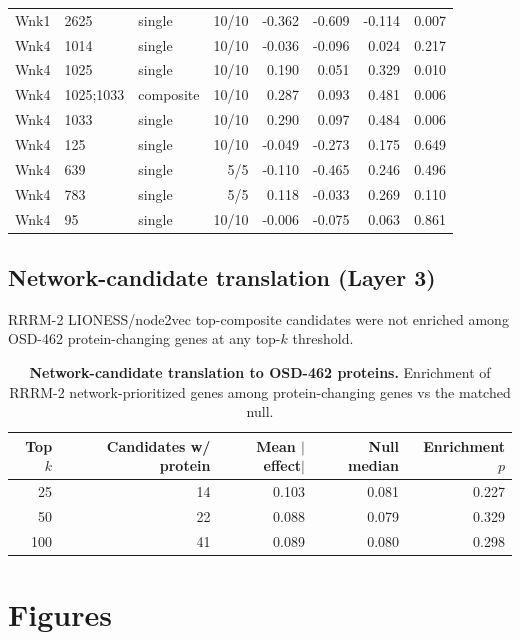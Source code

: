 \documentclass[10pt]{article}
\begin{document}
\begin{longtable}{lllrrrrr}
Wnk1 & 2625 & single & 10/10 & -0.362 & -0.609 & -0.114 & 0.007 \\
Wnk4 & 1014 & single & 10/10 & -0.036 & -0.096 & 0.024 & 0.217 \\
Wnk4 & 1025 & single & 10/10 & 0.190 & 0.051 & 0.329 & 0.010 \\
Wnk4 & 1025;1033 & composite & 10/10 & 0.287 & 0.093 & 0.481 & 0.006 \\
Wnk4 & 1033 & single & 10/10 & 0.290 & 0.097 & 0.484 & 0.006 \\
Wnk4 & 125 & single & 10/10 & -0.049 & -0.273 & 0.175 & 0.649 \\
Wnk4 & 639 & single & 5/5 & -0.110 & -0.465 & 0.246 & 0.496 \\
Wnk4 & 783 & single & 5/5 & 0.118 & -0.033 & 0.269 & 0.110 \\
Wnk4 & 95 & single & 10/10 & -0.006 & -0.075 & 0.063 & 0.861 \\
\end{longtable}

\subsection{Network-candidate translation (Layer 3)}

RRRM-2 LIONESS/node2vec top-composite candidates were not enriched among OSD-462 protein-changing genes at any top-$k$ threshold.

\begin{table}[H]
\centering\small
\caption{\textbf{Network-candidate translation to OSD-462 proteins.} Enrichment of RRRM-2 network-prioritized genes among protein-changing genes vs the matched null.}
\label{tab:network}
\begin{tabular}{rrrrr}
\toprule
Top $k$ & Candidates w/ protein & Mean $|$effect$|$ & Null median & Enrichment $p$ \\
\midrule
25 & 14 & 0.103 & 0.081 & 0.227 \\
50 & 22 & 0.088 & 0.079 & 0.329 \\
100 & 41 & 0.089 & 0.080 & 0.298 \\
\bottomrule
\end{tabular}
\end{table}

\section{Figures}
\end{document}
